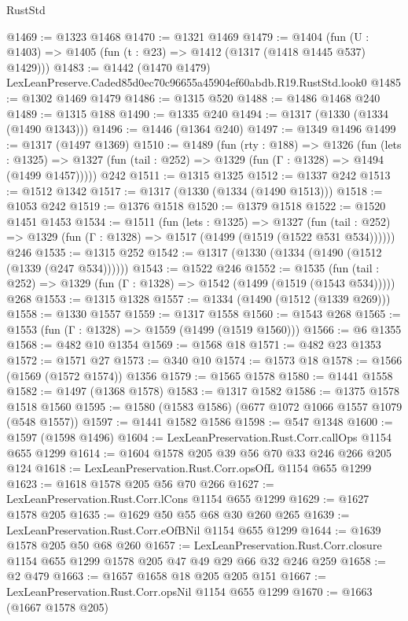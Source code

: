 \begin{lexlean}{RustStd}
\begin{coremodule}
@1469 := @1323 @1468
@1470 := @1321 @1469
@1479 := @1404 (fun (U : @1403) => @1405 (fun (t : @23) => @1412 (@1317 (@1418 @1445 @537) @1429)))
@1483 := @1442 (@1470 @1479) LexLeanPreserve.Caded85d0ec70c96655a45904ef60abdb.R19.RustStd.look0
@1485 := @1302 @1469 @1479
@1486 := @1315 @520
@1488 := @1486 @1468 @240
@1489 := @1315 @188
@1490 := @1335 @240
@1494 := @1317 (@1330 (@1334 (@1490 @1343)))
@1496 := @1446 (@1364 @240)
@1497 := @1349 @1496
@1499 := @1317 (@1497 @1369)
@1510 := @1489
    (fun (rty : @188) =>
    @1326
      (fun (lets : @1325) =>
      @1327 (fun (tail : @252) => @1329 (fun (Γ : @1328) => @1494 (@1499 @1457)))))
    @242
@1511 := @1315 @1325
@1512 := @1337 @242
@1513 := @1512 @1342
@1517 := @1317 (@1330 (@1334 (@1490 @1513)))
@1518 := @1053 @242
@1519 := @1376 @1518
@1520 := @1379 @1518
@1522 := @1520 @1451 @1453
@1534 := @1511
    (fun (lets : @1325) =>
    @1327 (fun (tail : @252) => @1329 (fun (Γ : @1328) => @1517 (@1499 (@1519 (@1522 @531 @534))))))
    @246
@1535 := @1315 @252
@1542 := @1317 (@1330 (@1334 (@1490 (@1512 (@1339 (@247 @534))))))
@1543 := @1522 @246
@1552 := @1535
    (fun (tail : @252) => @1329 (fun (Γ : @1328) => @1542 (@1499 (@1519 (@1543 @534)))))
    @268
@1553 := @1315 @1328
@1557 := @1334 (@1490 (@1512 (@1339 @269)))
@1558 := @1330 @1557
@1559 := @1317 @1558
@1560 := @1543 @268
@1565 := @1553 (fun (Γ : @1328) => @1559 (@1499 (@1519 @1560)))
@1566 := @6 @1355
@1568 := @482 @10 @1354
@1569 := @1568 @18
@1571 := @482 @23 @1353
@1572 := @1571 @27
@1573 := @340 @10
@1574 := @1573 @18
@1578 := @1566 (@1569 (@1572 @1574)) @1356
@1579 := @1565 @1578
@1580 := @1441 @1558
@1582 := @1497 (@1368 @1578)
@1583 := @1317 @1582
@1586 := @1375 @1578 @1518 @1560
@1595 := @1580 (@1583 @1586) (@677 @1072 @1066 @1557 @1079 (@548 @1557))
@1597 := @1441 @1582 @1586
@1598 := @547 @1348
@1600 := @1597 (@1598 @1496)
@1604 := LexLeanPreservation.Rust.Corr.callOps @1154 @655 @1299
@1614 := @1604 @1578 @205 @39 @56 @70 @33 @246 @266 @205 @124
@1618 := LexLeanPreservation.Rust.Corr.opsOfL @1154 @655 @1299
@1623 := @1618 @1578 @205 @56 @70 @266
@1627 := LexLeanPreservation.Rust.Corr.lCons @1154 @655 @1299
@1629 := @1627 @1578 @205
@1635 := @1629 @50 @55 @68 @30 @260 @265
@1639 := LexLeanPreservation.Rust.Corr.eOfBNil @1154 @655 @1299
@1644 := @1639 @1578 @205 @50 @68 @260
@1657 := LexLeanPreservation.Rust.Corr.closure
    @1154
    @655
    @1299
    @1578
    @205
    @47
    @49
    @29
    @66
    @32
    @246
    @259
@1658 := @2 @479
@1663 := @1657 @1658 @18 @205 @205 @151
@1667 := LexLeanPreservation.Rust.Corr.opsNil @1154 @655 @1299
@1670 := @1663 (@1667 @1578 @205)

\end{coremodule}
\end{lexlean}
